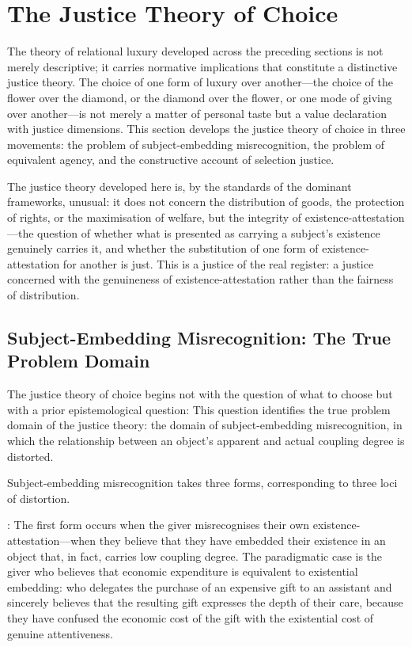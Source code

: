 \section{The Justice Theory of Choice}
\label{p16:sec:justice}

\noindent
The theory of relational luxury developed across the preceding sections is not merely descriptive; it carries normative implications that constitute a distinctive justice theory. The choice of one form of luxury over another---the choice of the flower over the diamond, or the diamond over the flower, or one mode of giving over another---is not merely a matter of personal taste but a value declaration with justice dimensions. This section develops the justice theory of choice in three movements: the problem of subject-embedding misrecognition, the problem of equivalent agency, and the constructive account of selection justice.

The justice theory developed here is, by the standards of the dominant frameworks, unusual: it does not concern the distribution of goods, the protection of rights, or the maximisation of welfare, but the integrity of existence-attestation---the question of whether what is presented as carrying a subject's existence genuinely carries it, and whether the substitution of one form of existence-attestation for another is just. This is a justice of the real register: a justice concerned with the genuineness of existence-attestation rather than the fairness of distribution.

\subsection{Subject-Embedding Misrecognition: The True Problem Domain}
\label{p16:subsec:misrecognition}

\noindent
The justice theory of choice begins not with the question of what to choose but with a prior epistemological question:  This question identifies the true problem domain of the justice theory: the domain of subject-embedding misrecognition, in which the relationship between an object's apparent and actual coupling degree is distorted.

Subject-embedding misrecognition takes three forms, corresponding to three loci of distortion.

: The first form occurs when the giver misrecognises their own existence-attestation---when they believe that they have embedded their existence in an object that, in fact, carries low coupling degree. The paradigmatic case is the giver who believes that economic expenditure is equivalent to existential embedding: who delegates the purchase of an expensive gift to an assistant and sincerely believes that the resulting gift expresses the depth of their care, because they have confused the economic cost of the gift with the existential cost of genuine attentiveness.

